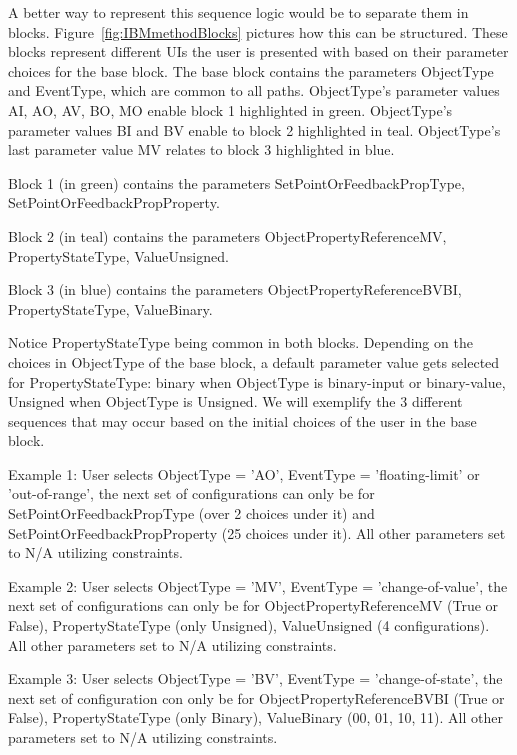 \documentclass[conference]{IEEEtran}
\begin{document}
%

	A better way to represent this sequence logic would be to separate them in blocks.
	Figure~\ref{fig:IBMmethodBlocks} pictures how this can be structured.
	These blocks represent different UIs
	the user is presented with based on their parameter choices for the base block.
	The base block contains the parameters ObjectType and EventType,
	which are common to all paths. ObjectType's parameter values
	AI, AO, AV, BO, MO enable block 1 highlighted in green. ObjectType's parameter values BI
	and BV enable to block 2 highlighted in teal.
	ObjectType's last parameter value MV relates to block 3 highlighted in blue.
	
	Block 1 (in green) contains the parameters SetPointOrFeedbackPropType, SetPointOrFeedbackPropProperty.
	
	Block 2 (in teal) contains the parameters ObjectPropertyReferenceMV, PropertyStateType, ValueUnsigned.
	
	Block 3 (in blue) contains the parameters ObjectPropertyReferenceBVBI, PropertyStateType, ValueBinary.
	
	Notice PropertyStateType being common in both blocks. Depending on the choices in ObjectType
	of the base block, a default parameter value gets selected for PropertyStateType:
	binary when ObjectType is binary-input or binary-value, Unsigned when ObjectType is Unsigned.
	We will exemplify the 3 different sequences that may occur based on the initial choices of the user in the base block.
	
	Example 1: User selects ObjectType = 'AO', EventType = 'floating-limit' or 'out-of-range',
	the next set of configurations can only be for SetPointOrFeedbackPropType (over 2 choices under it)
	and SetPointOrFeedbackPropProperty (25 choices under it). 
	All other parameters set to N/A utilizing constraints. 
	
	Example 2: User selects ObjectType = 'MV', EventType = 'change-of-value',
	the next set of configurations can only be for ObjectPropertyReferenceMV (True or False),
	PropertyStateType (only Unsigned), ValueUnsigned (4 configurations). 
	All other parameters set to N/A utilizing constraints. 
	
	Example 3: User selects ObjectType = 'BV', EventType = 'change-of-state',
	the next set of configuration con only be for ObjectPropertyReferenceBVBI (True or False),
	PropertyStateType (only Binary), ValueBinary (00, 01, 10, 11).
	All other parameters set to N/A utilizing constraints. 
\end{document}
